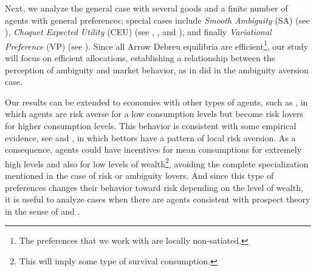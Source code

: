 \documentclass[pdftex]{article}
\numberwithin{equation}{section}
\theoremstyle{th}
\newtheorem{proof lemma}{{Proof Lemma}.}
\theoremstyle{definition}
\newtheorem*{risk lovers}{Risk lovers}
\newtheorem*{risk averse}{Risk averse}
\begin{document}
Next, we analyze the general case with several goods
and a finite number of agents with general preferences; special cases include \emph{Smooth Ambiguity} (SA) (see \cite{KMM}), \emph{Choquet Expected Utility} (CEU) (see \cite{Schmeidler}, \cite{GS}, \cite{Yaari} and \cite{Quiggin1,Quiggin2}), and finally \emph{Variational Preference} (VP) (see \cite{MMR}). {Since} all Arrow Debreu equilibria are efficient\footnote{The preferences that we work with are locally non-satiated.}, our study will focus on efficient allocations, establishing a relationship between the perception of ambiguity and market behavior, as in \cite{RSS} {did in the ambiguity aversion case}. 


Our results can be extended to economies with other types of agents, such as \cite{FS}, in which agents are risk averse for a low consumption levels but become risk lovers for higher consumption levels. {This behavior is consistent with some empirical evidence, see \cite{JS} and \cite{CSSG}, in which bettors have a pattern of local risk aversion. As a consequence, agents could have incentives for mean consumptions for extremely high levels and also for low levels of wealth\footnote{This will imply some type of survival consumption.}, avoiding the complete specialization mentioned in the case of risk or ambiguity lovers. And since this type of preferences changes their behavior toward risk depending on the level of wealth, it is useful to analyze cases when there are agents consistent with prospect theory in the sense of \cite{KT92} and \cite{JS}.}






\end{document}
